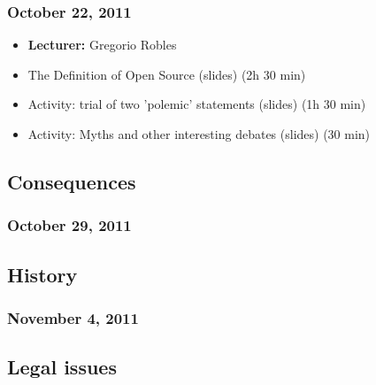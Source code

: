 \documentclass[a4paper]{article}
\begin{document}
\subsubsection{October 22, 2011}

\begin{itemize}
\item \textbf{Lecturer:} Gregorio Robles

\item The Definition of Open Source (slides) (2h 30 min)

\item Activity: trial of two 'polemic' statements (slides) (1h 30 min)

\item Activity: Myths and other interesting debates (slides) (30 min)

\end{itemize}

\subsection{Consequences}


\subsubsection{October 29, 2011}


\subsection{History}


\subsubsection{November 4, 2011}



\subsection{Legal issues}
\end{document}
